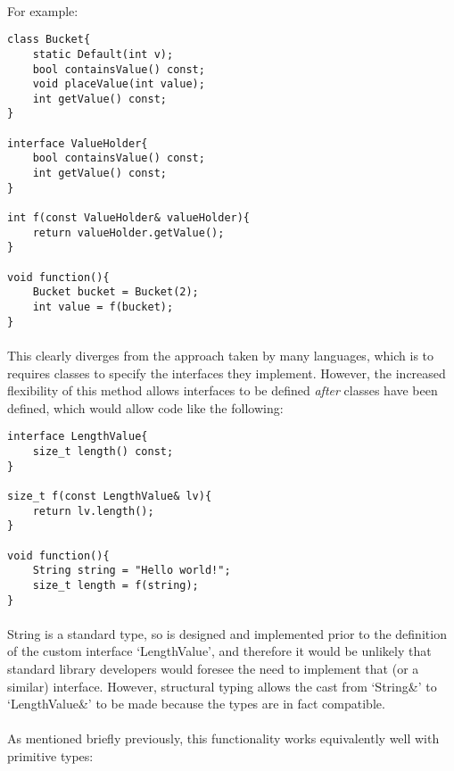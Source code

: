\documentclass[12pt,twoside,notitlepage]{report}
\begin{document}
\paragraph{}
For example:


\begin{lstlisting}
class Bucket{
	static Default(int v);
	bool containsValue() const;
	void placeValue(int value);
	int getValue() const;
}

interface ValueHolder{
	bool containsValue() const;
	int getValue() const;
}

int f(const ValueHolder& valueHolder){
	return valueHolder.getValue();
}

void function(){
	Bucket bucket = Bucket(2);
	int value = f(bucket);
}
\end{lstlisting}


\paragraph{}
This clearly diverges from the approach taken by many languages, which is to requires classes to specify the interfaces they implement. However, the increased flexibility of this method allows interfaces to be defined \emph{after} classes have been defined, which would allow code like the following:


\begin{lstlisting}
interface LengthValue{
	size_t length() const;
}

size_t f(const LengthValue& lv){
	return lv.length();
}

void function(){
	String string = "Hello world!";
	size_t length = f(string);
}
\end{lstlisting}


\paragraph{}
String is a standard type, so is designed and implemented prior to the definition of the custom interface `LengthValue', and therefore it would be unlikely that standard library developers would foresee the need to implement that (or a similar) interface. However, structural typing allows the cast from `String\&' to `LengthValue\&' to be made because the types are in fact compatible.

\paragraph{}
As mentioned briefly previously, this functionality works equivalently well with primitive types:
\end{document}

